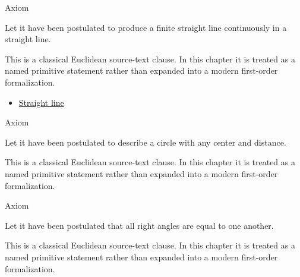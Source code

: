 \begin{axiombox}{Axiom}
\begin{axiom}
\label{ax:euclid-postulate-produce-straight-line}
Let it have been postulated to produce a finite straight line continuously in a
straight line.
\end{axiom}
\end{axiombox}
\begin{remark*}
This is a classical Euclidean source-text clause. In this chapter it is treated
as a named primitive statement rather than expanded into a modern first-order
formalization.
\end{remark*}

\begin{lra-not-visible}
\begin{dependencies}
\begin{itemize}
  \item \hyperref[def:euclid-straight-line]{Straight line}
\end{itemize}
\end{dependencies}
\end{lra-not-visible}

\begin{axiombox}{Axiom}
\begin{axiom}
\label{ax:euclid-postulate-describe-circle}
Let it have been postulated to describe a circle with any center and distance.
\end{axiom}
\end{axiombox}
\begin{remark*}
This is a classical Euclidean source-text clause. In this chapter it is treated
as a named primitive statement rather than expanded into a modern first-order
formalization.
\end{remark*}

\begin{lra-not-visible}
\NoLocalDependencies
\end{lra-not-visible}

\begin{axiombox}{Axiom}
\begin{axiom}
\label{ax:euclid-postulate-right-angles-equal}
Let it have been postulated that all right angles are equal to one another.
\end{axiom}
\end{axiombox}
\begin{remark*}
This is a classical Euclidean source-text clause. In this chapter it is treated
as a named primitive statement rather than expanded into a modern first-order
formalization.
\end{remark*}

